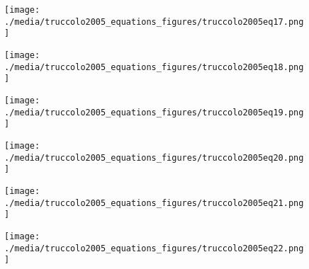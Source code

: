 \documentclass[svgnames,13pt]{beamer}
\begin{document}
\begin{frame}{}
\begin{figure}\centering\texttt{[image: ./media/truccolo2005\_equations\_figures/truccolo2005eq17.png]}\\\end{figure}
\end{frame} 

\begin{frame}{}
\begin{figure}\centering\texttt{[image: ./media/truccolo2005\_equations\_figures/truccolo2005eq18.png]}\\\end{figure}
\end{frame} 

\begin{frame}{}
\begin{figure}\centering\texttt{[image: ./media/truccolo2005\_equations\_figures/truccolo2005eq19.png]}\\\end{figure}
\end{frame} 

\begin{frame}{}
\begin{figure}\centering\texttt{[image: ./media/truccolo2005\_equations\_figures/truccolo2005eq20.png]}\\\end{figure}
\end{frame} 

\begin{frame}{}
\begin{figure}\centering\texttt{[image: ./media/truccolo2005\_equations\_figures/truccolo2005eq21.png]}\\\end{figure}
\end{frame} 

\begin{frame}{}
\begin{figure}\centering\texttt{[image: ./media/truccolo2005\_equations\_figures/truccolo2005eq22.png]}\\\end{figure}
\end{frame} 
\end{document}
